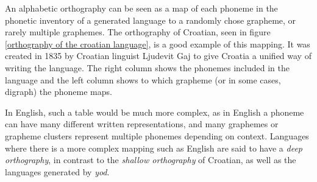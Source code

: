 \documentclass{report}
\begin{document}
	An alphabetic orthography can be seen as a map of each phoneme in the phonetic inventory of a generated language to a randomly chose grapheme, or rarely multiple graphemes. The orthography of Croatian, seen in figure \ref{orthography of the croatian language}, is a good example of this mapping. It was created in 1835 by Croatian linguist Ljudevit Gaj to give Croatia a unified way of writing the language. The right column shows the phonemes included in the language and the left column shows to which grapheme (or in some cases, digraph) the phoneme maps.
	
	In English, such a table would be much more complex, as in English a phoneme can have many different written representations, and many graphemes or grapheme clusters represent multiple phonemes depending on context. Languages where there is a more complex mapping such as English are said to have a \textit{deep orthography}, in contrast to the \textit{shallow orthography} of Croatian, as well as the languages generated by \textit{yod}.
	
\end{document}
